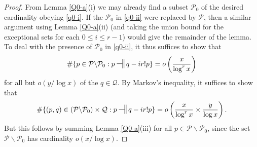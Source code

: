\documentclass[12pt]{amsart}
\numberwithin{equation}{section}  %
\theoremstyle{remark}
\theoremstyle{plain}
\newtheorem{lem}{Lemma}[section]
\numberwithin{equation}{section}
\newcommand{\be}{\begin{equation}}
\newcommand{\ee}{\end{equation}}
\renewcommand{\le}{\leqslant}
\renewcommand{\leq}{\leqslant}
\renewcommand{\ge}{\geqslant}
\renewcommand{\(}{\left(}
\renewcommand{\)}{\right)}
\newcommand{\relr}{\nsdtstile{}{}} %
\newcommand{\PP}{\mathcal{P}}
\newcommand{\QQ}{\mathcal{Q}}
\begin{document}
\begin{proof}  From Lemma \ref{Q0-a}(i) we may already find a subset $\PP_0$ of the desired cardinality obeying \eqref{q0-i}.  If the $\PP_0$ in \eqref{q0-ii} were replaced by $\PP$, then a similar argument using Lemma \ref{Q0-a}(ii) (and taking the union bound for the exceptional sets for each $0 \leq i \leq r-1$) would give the remainder of the lemma.  To deal with the presence of $\PP_0$ in \eqref{q0-ii}, it thus suffices to show that
$$
 \# \{ p \in \PP \backslash \PP_0 : p \relr q-ir!p \} = o\left( \frac{x}{\log^r x} \right)$$
for all but $o(y/\log x)$ of the $q \in \QQ$.  By Markov's inequality, it suffices to show that
$$
 \# \{ (p,q) \in (\PP \backslash \PP_0) \times \QQ : p \relr q-ir!p \} = o\left( \frac{x}{\log^r x} \times \frac{y}{\log x}\right).$$
But this follows by summing Lemma \ref{Q0-a}(iii) for all $p \in \PP \backslash \PP_0$, since the set $\PP \backslash \PP_0$ has cardinality $o(x/\log x)$.
\end{proof}






\end{document}

